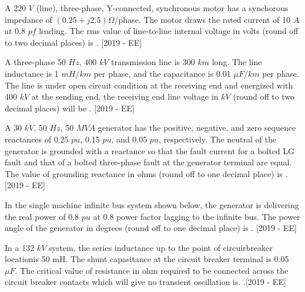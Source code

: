 \item A 220 $V$ (line), three-phase, Y-connected, synchronous motor has a synchorous impedance of $(0.25 + j2.5)\Omega$/phase. The motor draws the rated current of 10 $A$ at 0.8 $pf$ leading. The rms value of line-to-line internal voltage in volts (round off to two decimal places) is \underline{\hspace{3cm}}. \hfill{[2019 - EE]}
\item A three-phase 50 $Hz$, 400 $kV$ transmission line is 300 $km$ long. The line inductance is 1 $mH/km$ per phase, and the capacitance is 0.01 $\mu F/km$ per phase. The line is under open circuit condition at the receiving end and energized with 400 $kV$ at the sending end, the receiving end line voltage in $kV$ (round off to two decimal places) will be \underline{\hspace{3cm}}. \hfill{[2019 - EE]}
\item A 30 $kV$, 50 $Hz$, 50 $MVA$ generator has the positive, negative, and zero sequence reactances of 0.25 $pu$, 0.15 $pu$, and 0.05 $pu$, respectively. The neutral of the generator is grounded with a reactance so that the fault current for a bolted LG fault and that of a bolted three-phase fault at the generator terminal are equal. The value of grounding reactance in ohms (round off to one decimal place) is \underline{\hspace{3cm}}. \hfill{[2019 - EE]}
\item In the single machine infinite bus system shown below, the generator is delivering the real power of 0.8 $pu$ at 0.8 power factor lagging to the infinite bus. The power angle of the generator in degrees (round off to one decimal place) is \underline{\hspace{3cm}}. \hfill{[2019 - EE]}
    \begin{center}
        
    \end{center}
    \item In a 132 $kV$ system, the series inductance up to the point of circuirbreaker locationis 50 mH. The shunt capasitance at the circuit breaker terminal is 0.05 $\mu F$. The critical value of resistance in ohm required to be connected across the circuit breaker contacts which will give no transient oscillation is. \underline{\hspace{3cm}}.\hfill{[2019 - EE]}


